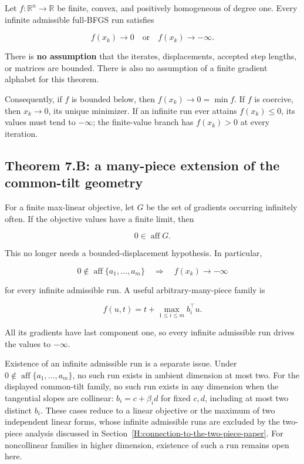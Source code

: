 Let \(f:\mathbb R^n\to\mathbb R\) be finite, convex, and positively
homogeneous of degree one. Every infinite admissible full-BFGS run
satisfies

\[
\boxed{f(x_k)\longrightarrow0\quad\text{or}\quad f(x_k)\longrightarrow-\infty.}
\]

There is \textbf{no assumption} that the iterates, displacements,
accepted step lengths, or matrices are bounded. There is also no
assumption of a finite gradient alphabet for this theorem.

Consequently, if \(f\) is bounded below, then \(f(x_k)\to0=\min f\). If
\(f\) is coercive, then \(x_k\to0\), its unique minimizer. If an
infinite run ever attains \(f(x_k)\le0\), its values must tend to
\(-\infty\); the finite-value branch has \(f(x_k)>0\) at every
iteration.



\subsection{Theorem 7.B: a many-piece extension of the common-tilt
geometry}\label{H:theorem-b-a-many-piece-extension-of-the-common-tilt-geometry}

For a finite max-linear objective, let \(G\) be the set of gradients
occurring infinitely often. If the objective values have a finite limit,
then

\[
\boxed{0\in\operatorname{aff}G.}
\]

This no longer needs a bounded-displacement hypothesis. In particular,

\[
0\notin\operatorname{aff}\{a_1,\ldots,a_m\}
\quad\Longrightarrow\quad
f(x_k)\longrightarrow-\infty
\]

for every infinite admissible run. A useful arbitrary-many-piece family
is

\[
\boxed{f(u,t)=t+\max_{1\le i\le m}b_i^\top u.}
\]

All its gradients have last component one, so every infinite admissible
run drives the values to \(-\infty\).

Existence of an infinite admissible run is a separate issue. Under
\(0\notin\operatorname{aff}\{a_1,\ldots,a_m\}\), no such run exists
in ambient dimension at most two. For the displayed common-tilt family,
no such run exists in any dimension when the tangential slopes are collinear:
\(b_i=c+\beta_i d\) for fixed \(c,d\), including at most two distinct \(b_i\).
These cases reduce to a linear objective or the maximum of two independent
linear forms, whose infinite admissible runs are excluded by the two-piece
analysis discussed in Section~\ref{H:connection-to-the-two-piece-paper}.
For noncollinear families in higher dimension, existence of such a run
remains open here.

